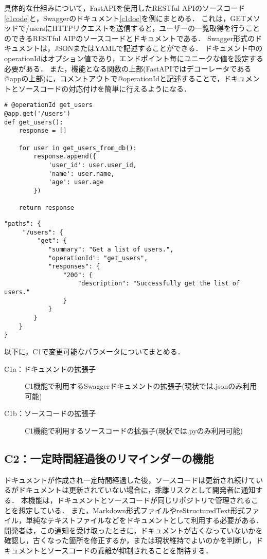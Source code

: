 具体的な仕組みについて，FastAPIを使用したRESTful APIのソースコード\ref{c1code}と，Swaggerのドキュメント\ref{c1doc}を例にまとめる．
これは，GETメソッドで/usersにHTTPリクエストを送信すると，ユーザーの一覧取得を行うことのできるRESTful AIPのソースコードとドキュメントである．
Swagger形式のドキュメントは，JSONまたはYAMLで記述することができる．
ドキュメント中のoperationIdはオプション値であり，エンドポイント毎にユニークな値を設定する必要がある．
また，機能となる関数の上部(FastAPIではデコーレータである@appの上部)に，コメントアウトで@operationIdと記述することで，ドキュメントとソースコードの対応付けを簡単に行えるようになる．

\begin{lstlisting}[caption=RESTful API, label=c1code]
# @operationId get_users
@app.get('/users')
def get_users():
    response = []

    for user in get_users_from_db():
        response.append({
            'user_id': user.user_id,
            'name': user.name,
            'age': user.age
        })

    return response
\end{lstlisting}


\begin{lstlisting}[caption=Swagger,label=c1doc]
"paths": {
     "/users": {
         "get": {
            "summary": "Get a list of users.",
            "operationId": "get_users",
            "responses": {
                "200": {
                    "description": "Successfully get the list of users."
                }
            }
        }
    }
}
\end{lstlisting}

以下に，C1で変更可能なパラメータについてまとめる．
\begin{description}
    \item[C1a：ドキュメントの拡張子] C1機能で利用するSwaggerドキュメントの拡張子(現状では.jsonのみ利用可能)
    \item[C1b：ソースコードの拡張子] C1機能で利用するソースコードの拡張子(現状では.pyのみ利用可能)
\end{description}


\subsection{C2：一定時間経過後のリマインダーの機能}
\label{c2}
ドキュメントが作成され一定時間経過した後，ソースコードは更新され続けているがドキュメントは更新されていない場合に，乖離リスクとして開発者に通知する．
本機能は，ドキュメントとソースコードが同じリポジトリで管理されることを想定している．
また，Markdown形式ファイルやreStructuredText形式ファイル，単純なテキストファイルなどをドキュメントとして利用する必要がある．
開発者は，この通知を受け取ったときに，ドキュメントが古くなっていないかを確認し，古くなった箇所を修正するか，または現状維持でよいのかを判断し，ドキュメントとソースコードの乖離が抑制されることを期待する．

